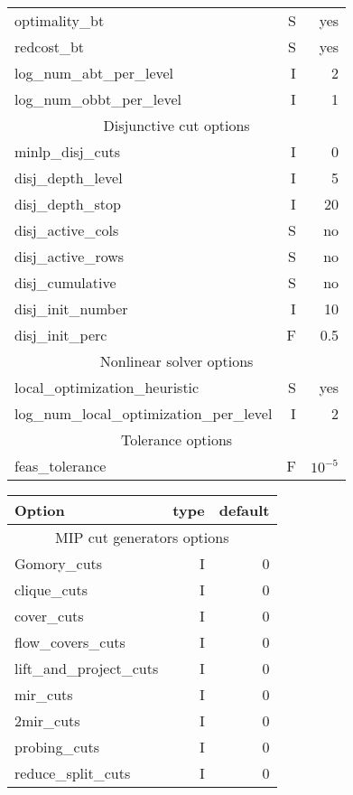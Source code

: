 \begin{center}
\begin{tabular}{|l|r|r|}
optimality\_bt& S& yes\\
redcost\_bt& S& yes\\
log\_num\_abt\_per\_level& I& 2\\
log\_num\_obbt\_per\_level& I& 1\\\hline
\multicolumn{3}{|c|}{Disjunctive cut options}\\
\hline
minlp\_disj\_cuts& I& 0\\
disj\_depth\_level& I& 5\\
disj\_depth\_stop& I& 20\\
disj\_active\_cols& S& no\\
disj\_active\_rows& S& no\\
disj\_cumulative& S& no\\
disj\_init\_number& I& 10\\
disj\_init\_perc& F& 0.5\\\hline
\multicolumn{3}{|c|}{Nonlinear solver options}\\
\hline
local\_optimization\_heuristic& S& yes\\
log\_num\_local\_optimization\_per\_level& I& 2\\\hline
\multicolumn{3}{|c|}{Tolerance options}\\
\hline
feas\_tolerance& F& $10^{-5}$\\\hline
\end{tabular}

\begin{tabular}{|l|r|r|}\hline
Option & type &  default \\
\hline
\hline
\multicolumn{3}{|c|}{MIP cut generators options}\\
\hline
Gomory\_cuts& I& 0\\
clique\_cuts& I& 0\\
cover\_cuts& I& 0\\
flow\_covers\_cuts& I& 0\\
lift\_and\_project\_cuts& I& 0\\
mir\_cuts& I& 0\\
2mir\_cuts& I& 0\\
probing\_cuts& I& 0\\
reduce\_split\_cuts& I& 0\\
\hline
\end{tabular}
\end{center}


